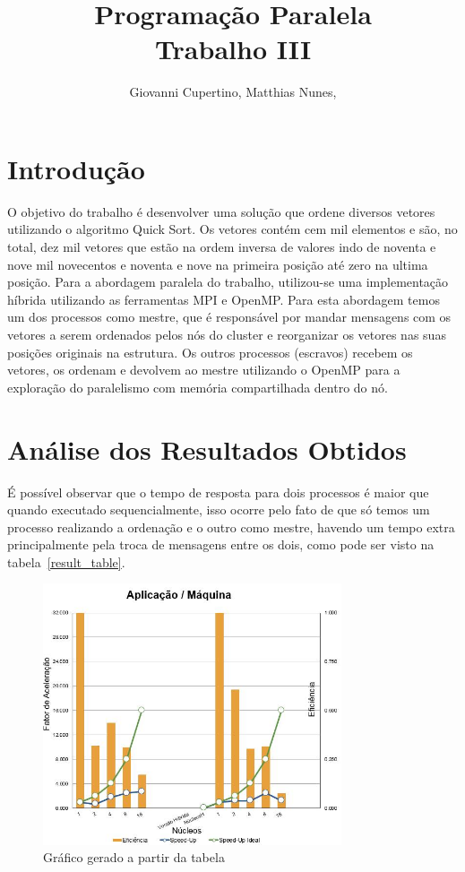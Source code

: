\documentclass[11pt]{IEEEtran}
\title{Programação Paralela\\ Trabalho III}
\author{Giovanni Cupertino, Matthias Nunes, \IEEEmembership{Usuário pp12820}}
\begin{document}
\maketitle

\section{Introdução}

	O objetivo do trabalho é desenvolver uma solução que ordene diversos vetores
	utilizando o algoritmo Quick Sort.  Os vetores contém cem mil elementos e
	são, no total, dez mil vetores que estão na ordem inversa de valores indo de
	noventa e nove mil novecentos e noventa e nove na primeira posição até zero
	na ultima posição.  Para a abordagem paralela do trabalho, utilizou-se uma
	implementação híbrida utilizando as ferramentas MPI e OpenMP\@. Para esta 
	abordagem temos um dos processos como mestre, que é responsável por mandar 
	mensagens com os vetores a serem ordenados pelos nós do cluster e reorganizar
	os vetores nas suas posições originais na estrutura. Os outros processos 
	(escravos) recebem os vetores, os ordenam e devolvem ao mestre utilizando o 
	OpenMP para a exploração do paralelismo com memória compartilhada dentro do nó.

\section{Análise dos Resultados Obtidos}

	É possível observar que o tempo de resposta para dois
	processos é maior que quando executado sequencialmente, isso ocorre pelo
	fato de que só temos um processo realizando a ordenação e o outro como
	mestre, havendo um tempo extra principalmente pela troca de mensagens entre
	os dois, como pode ser visto na tabela~\ref{result_table}.

	\begin{figure}[H]
		\centering
		\includegraphics[width=88mm]{graph.png}
		\caption{Gráfico gerado a partir da tabela}
		\label{fig_graph}
	\end{figure}
\end{document}
